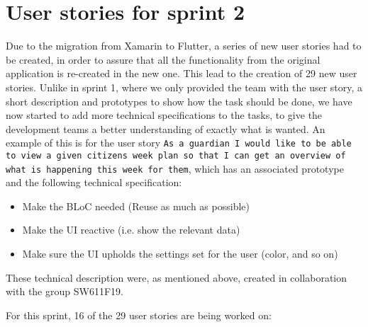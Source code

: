 \section{User stories for sprint 2}
Due to the migration from Xamarin to Flutter, a series of new user stories had to be created, in order to assure that all the functionality from the original application is re-created in the new one.
This lead to the creation of 29 new user stories.
Unlike in sprint 1, where we only provided the team with the user story, a short description and prototypes to show how the task should be done, we have now started to add more technical specifications to the tasks, to give the development teams a better understanding of exactly what is wanted.
An example of this is for the user story \texttt{As a guardian I would like to be able to view a given citizens week plan so that I can get an overview of what is happening this week for them}, which has an associated prototype and the following technical specification:

\begin{itemize}
    \item Make the BLoC needed (Reuse as much as possible)
    \item Make the UI reactive (i.e. show the relevant data)
    \item Make sure the UI upholds the settings set for the user (color, and so on)
\end{itemize}
These technical description were, as mentioned above, created in collaboration with the group SW611F19.

For this sprint, 16 of the 29 user stories are being worked on:

